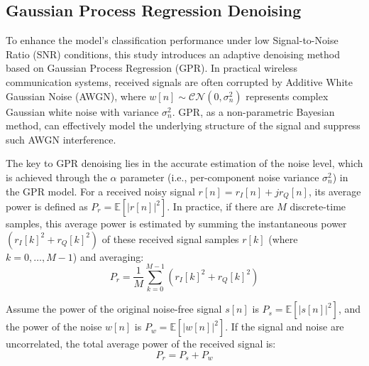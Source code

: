 \documentclass[conference]{IEEEtran}
\begin{document}



\subsection{Gaussian Process Regression Denoising}

To enhance the model's classification performance under low Signal-to-Noise Ratio (SNR) conditions, this study introduces an adaptive denoising method based on Gaussian Process Regression (GPR). In practical wireless communication systems, received signals are often corrupted by Additive White Gaussian Noise (AWGN), where $w[n] \sim \mathcal{CN}(0, \sigma_n^2)$ represents complex Gaussian white noise with variance $\sigma_n^2$. GPR, as a non-parametric Bayesian method, can effectively model the underlying structure of the signal and suppress such AWGN interference.

The key to GPR denoising lies in the accurate estimation of the noise level, which is achieved through the $\alpha$ parameter (i.e., per-component noise variance $\sigma_n^2$) in the GPR model. For a received noisy signal $r[n]=r_I[n]+jr_Q[n]$, its average power is defined as $P_r = \mathbb{E}[|r[n]|^2]$. In practice, if there are $M$ discrete-time samples, this average power is estimated by summing the instantaneous power $(r_I[k]^2 + r_Q[k]^2)$ of these received signal samples $r[k]$ (where $k=0, \ldots, M-1$) and averaging:
\begin{equation}
P_r = \frac{1}{M}\sum_{k=0}^{M-1}(r_I[k]^2+r_Q[k]^2)
\end{equation}

Assume the power of the original noise-free signal $s[n]$ is $P_s = \mathbb{E}[|s[n]|^2]$, and the power of the noise $w[n]$ is $P_w = \mathbb{E}[|w[n]|^2]$. If the signal and noise are uncorrelated, the total average power of the received signal is:
\begin{equation}
P_r = P_s + P_w
\end{equation}
\end{document}
